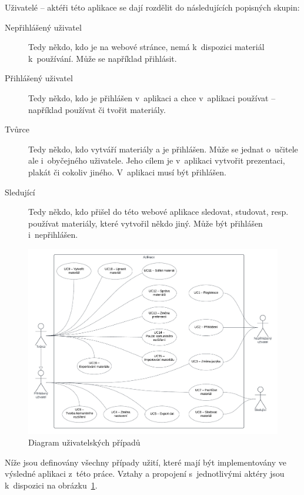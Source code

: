 Uživatelé -- aktéři této aplikace se dají rozdělit do následujících popisných skupin:

\begin{description}
    \item[Nepřihlášený uživatel] Tedy někdo, kdo je na webové stránce, nemá k~dispozici materiál k~používání. Může se například přihlásit.
    \item[Přihlášený uživatel] Tedy někdo, kdo je přihlášen v~aplikaci a chce v~aplikaci používat -- například používat či tvořit materiály.
    \item[Tvůrce] Tedy někdo, kdo vytváří materiály a je přihlášen. Může se jednat o~učitele ale i~obyčejného uživatele. Jeho cílem je v~aplikaci vytvořit prezentaci, plakát či cokoliv jiného. V~aplikaci musí být přihlášen.
    \item[Sledující] Tedy někdo, kdo přišel do této webové aplikace sledovat, studovat, resp. používat materiály, které vytvořil někdo jiný. Může být přihlášen i~nepřihlášen.
\end{description}


\begin{figure}[ht!]
    \centering
    \includegraphics[width=1\textwidth]{media/03_analyza/uzivatelske_pripady.pdf}
    \caption{Diagram uživatelských případů}\label{fig:uzivatelskePripady}
\end{figure}

Níže jsou definovány všechny případy užití, které mají být implementovány ve výsledné aplikaci z~této práce.
Vztahy a propojení s~jednotlivými aktéry jsou k~dispozici na obrázku~\ref{fig:uzivatelskePripady}.

